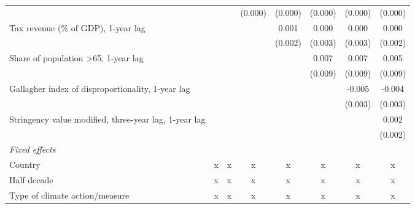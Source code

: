 \begin{tabular}{lccccccc}
                                                                  &                &                & (0.000)        & (0.000)       & (0.000)       & (0.000)       & (0.000)\\   
   Tax revenue (\% of GDP), 1-year lag                            &                &                &                & 0.001         & 0.000         & 0.000         & 0.000\\   
                                                                  &                &                &                & (0.002)       & (0.003)       & (0.003)       & (0.002)\\   
   Share of population >65, 1-year lag                            &                &                &                &               & 0.007         & 0.007         & 0.005\\   
                                                                  &                &                &                &               & (0.009)       & (0.009)       & (0.009)\\   
   Gallagher index of disproportionality, 1-year lag              &                &                &                &               &               & -0.005        & -0.004\\   
                                                                  &                &                &                &               &               & (0.003)       & (0.003)\\   
   Stringency value modified, three-year lag, 1-year lag          &                &                &                &               &               &               & 0.002\\   
                                                                  &                &                &                &               &               &               & (0.002)\\   
   \emph{Fixed effects}\\
   Country                                                        & x              & x              & x              & x             & x             & x             & x\\  
   Half decade                                                    & x              & x              & x              & x             & x             & x             & x\\  
   Type of climate action/measure                                 & x              & x              & x              & x             & x             & x             & x\\  

\end{tabular}
